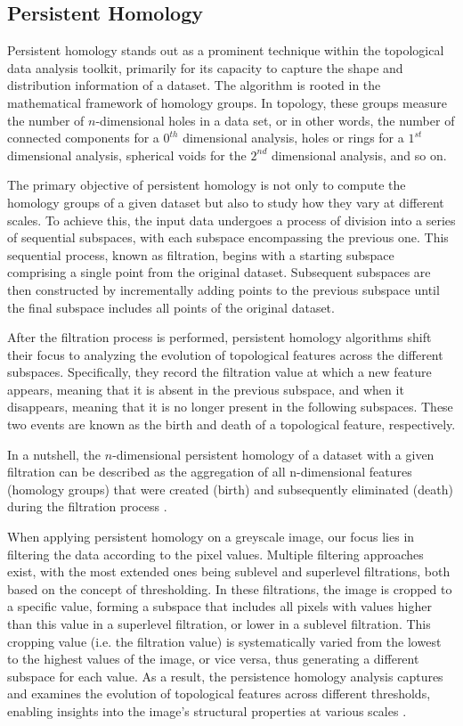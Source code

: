 \subsection{Persistent Homology}

Persistent homology stands out as a prominent technique within the topological data analysis toolkit, primarily for its capacity to capture the shape and distribution information of a dataset. The algorithm is rooted in the mathematical framework of homology groups. In topology, these groups measure the number of $n$-dimensional holes in a data set, or in other words, the number of connected components for a  $0^{th}$ dimensional analysis, holes or rings for a $1^{st}$ dimensional analysis, spherical voids for the $2^{nd}$ dimensional analysis, and so on. 

The primary objective of persistent homology is not only to compute the homology groups of a given dataset but also to study how they vary at different scales. To achieve this, the input data undergoes a process of division into a series of sequential subspaces, with each subspace encompassing the previous one. This sequential process, known as filtration, begins with a starting subspace comprising a single point from the original dataset. Subsequent subspaces are then constructed by incrementally adding points to the previous subspace until the final subspace includes all points of the original dataset. 

After the filtration process is performed, persistent homology algorithms shift their focus to analyzing the evolution of topological features across the different subspaces. Specifically, they record the filtration value at which a new feature appears, meaning that it is absent in the previous subspace, and when it disappears, meaning that it is no longer present in the following subspaces. These two events are known as the birth and death of a topological feature, respectively. 

In a nutshell, the $n$-dimensional persistent homology of a dataset with a given filtration can be described as the aggregation of all n-dimensional features (homology groups) that were created (birth) and subsequently eliminated (death) during the filtration process \citep{ph_filtration}.

When applying persistent homology on a greyscale image, our focus lies in filtering the data according to the pixel values. Multiple filtering approaches exist, with the most extended ones being sublevel and superlevel filtrations, both based on the concept of thresholding. In these filtrations, the image is cropped to a specific value, forming a subspace that includes all pixels with values higher than this value in a superlevel filtration, or lower in a sublevel filtration. This cropping value (i.e. the filtration value) is systematically varied from the lowest to the highest values of the image, or vice versa, thus generating a different subspace for each value. As a result, the persistence homology analysis captures and examines the evolution of topological features across different thresholds, enabling insights into the image's structural properties at various scales \citep{ph_image_filtration}.

